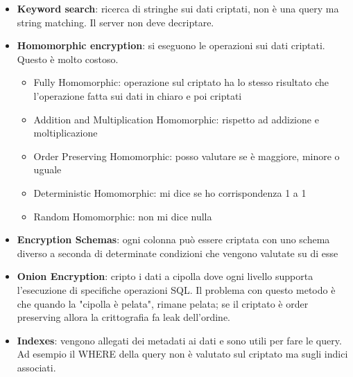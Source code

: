 \begin{itemize}
    \item \textbf{Keyword search}: ricerca di stringhe sui dati criptati, non è una query ma string matching. Il server non deve decriptare.
    \item \textbf{Homomorphic encryption}: si eseguono le operazioni sui dati criptati. Questo è molto costoso.
    \begin{itemize}
        \item Fully Homomorphic: operazione sul criptato ha lo stesso risultato che l'operazione fatta sui dati in chiaro e poi criptati
        \item Addition and Multiplication Homomorphic: rispetto ad addizione e moltiplicazione
        \item Order Preserving Homomorphic: posso valutare se è maggiore, minore o uguale
        \item Deterministic Homomorphic: mi dice se ho corrispondenza 1 a 1 
        \item Random Homomorphic: non mi dice nulla
    \end{itemize}
    \item \textbf{Encryption Schemas}: ogni colonna può essere criptata con uno schema diverso a seconda di determinate condizioni che vengono valutate su di esse
    \item \textbf{Onion Encryption}: cripto i dati a cipolla dove ogni livello supporta l'esecuzione di specifiche operazioni SQL. Il problema con questo metodo è che quando la "cipolla è pelata", rimane pelata; se il criptato è order preserving allora la crittografia fa leak dell’ordine.
    \item \textbf{Indexes}: vengono allegati dei metadati ai dati e sono utili per fare le query. Ad esempio il WHERE della query non è valutato sul criptato ma sugli indici associati. 
\end{itemize}

